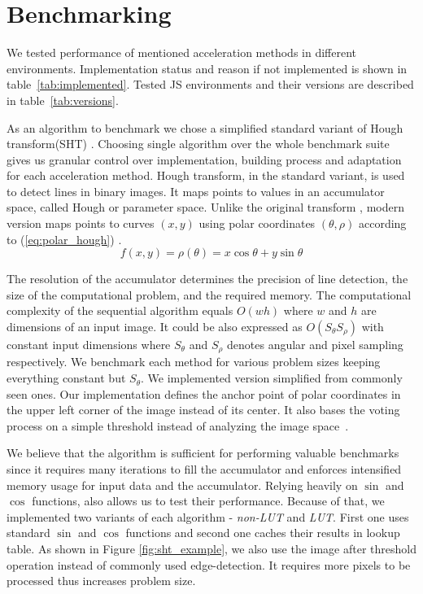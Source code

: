 \section{Benchmarking}\label{sec:benchmarking}

We tested performance of mentioned acceleration methods in different environments. Implementation status and reason if not implemented is shown in table~\ref{tab:implemented}. Tested JS environments and their versions are described in table~\ref{tab:versions}.


As an algorithm to benchmark we chose a simplified standard variant of Hough transform(SHT) \cite{mukhopadhyay2015survey}. Choosing single algorithm over the whole benchmark suite gives us granular control over implementation, building process and adaptation for each acceleration method. Hough transform, in the standard variant, is used to detect lines in binary images. It maps points to values in an accumulator space, called Hough or parameter space. Unlike the original transform \cite{hough1962method}, modern version maps points to curves $(x, y)$ using polar coordinates $(\theta, \rho)$ according to (\ref{eq:polar_hough}) \cite{duda1972use}.
\begin{equation}
    \label{eq:polar_hough}
    f(x,y) = \rho(\theta) = x\cos{\theta}+y\sin{\theta}
\end{equation}


The resolution of the accumulator determines the precision of line detection, the size of the computational problem, and the required memory. The computational complexity of the sequential algorithm equals $O(wh)$ where $w$ and $h$ are dimensions of an input image. It could be also expressed as $O(S_{\theta} S_\rho)$ with constant input dimensions where $S_{\theta}$ and $S_\rho$ denotes angular and pixel sampling respectively. We benchmark each method for various problem sizes keeping everything constant but $S_\theta$. We implemented version simplified from commonly seen ones. Our implementation defines the anchor point of polar coordinates in the upper left corner of the image instead of its center. It also bases the voting process on a simple threshold instead of analyzing the image space~\cite{palmer1997optimizing}.


We believe that the algorithm is sufficient for performing valuable benchmarks since it requires many iterations to fill the accumulator and enforces intensified memory usage for input data and the accumulator. Relying heavily on $\sin$ and $\cos$ functions, also allows us to test their performance. Because of that, we implemented two variants of each algorithm - \textit{non-LUT} and \textit{LUT}. First one uses standard $\sin$ and $\cos$ functions and second one caches their results in lookup table. As shown in Figure \ref{fig:sht_example}, we also use the image after threshold operation instead of commonly used edge-detection. It requires more pixels to be processed thus increases problem size.



